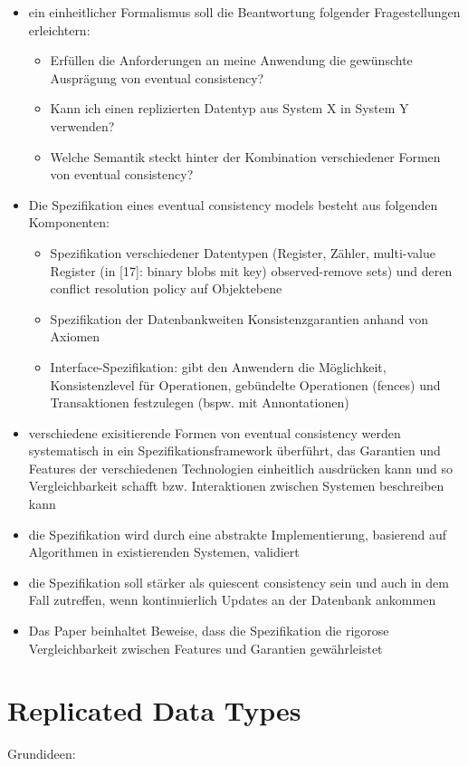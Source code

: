 \documentclass[11pt,a4paper,ngerman]{scrartcl}
\begin{document}
\begin{itemize}
\begin{itemize}
\end{itemize}
\item ein einheitlicher Formalismus soll die Beantwortung folgender Fragestellungen erleichtern:
\begin{itemize}
\item Erfüllen die Anforderungen an meine Anwendung die gewünschte Ausprägung von \gls{eventual consistency}?
\item Kann ich einen replizierten Datentyp aus System X in System Y verwenden?
\item Welche Semantik steckt hinter der Kombination verschiedener Formen von \gls{eventual consistency}?
\end{itemize}
\item Die Spezifikation eines \gls{eventual consistency} models besteht aus folgenden Komponenten:
\begin{itemize}
\item Spezifikation verschiedener Datentypen (Register, Zähler, multi-value Register (in [17]: binary blobs mit key) observed-remove sets) und deren conflict resolution policy auf Objektebene
\item Spezifikation der Datenbankweiten Konsistenzgarantien anhand von Axiomen
\item Interface-Spezifikation: gibt den Anwendern die Möglichkeit, Konsistenzlevel für Operationen, gebündelte Operationen (fences) und Transaktionen festzulegen (bspw. mit Annontationen) 
\end{itemize}
\item verschiedene exisitierende Formen von \gls{eventual consistency} werden systematisch in ein Spezifikationsframework überführt, das Garantien und Features der verschiedenen Technologien einheitlich ausdrücken kann und so Vergleichbarkeit schafft bzw. Interaktionen zwischen Systemen beschreiben kann
\item die Spezifikation wird durch eine abstrakte Implementierung, basierend auf Algorithmen in existierenden Systemen, validiert
\item die Spezifikation soll stärker als \gls{quiescent consistency} sein und auch in dem Fall zutreffen, wenn kontinuierlich Updates an der Datenbank ankommen
\item Das Paper beinhaltet Beweise, dass die Spezifikation die rigorose Vergleichbarkeit zwischen Features und Garantien gewährleistet
\end{itemize}

\section{Replicated Data Types}
Grundideen:
\end{document}
